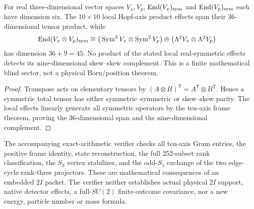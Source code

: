 \documentclass[11pt,a4paper]{article}
\begin{document}
\begin{proposition}
\label{p2f:prop:v318-reciprocal-real-effect-certificate}
For real three-dimensional vector spaces $V_x,V_p$,
$\operatorname{End}(V_x)_{\rm sym}$ and
$\operatorname{End}(V_p)_{\rm sym}$ each have dimension six.
The $10\times10$ local Hopf-axis product effects span their
36-dimensional tensor product, while
\[
 \operatorname{End}(V_x\otimes V_p)_{\rm sym}
 \cong\big(\operatorname{Sym}^2V_x\otimes
           \operatorname{Sym}^2V_p\big)
  \oplus\big(\Lambda^2V_x\otimes\Lambda^2V_p\big)
\]
has dimension $36+9=45$.
No product of the stated local real-symmetric effects detects
its nine-dimensional skew--skew complement.  This is a finite
mathematical blind sector, not a physical Born/position theorem.
\end{proposition}
\begin{proof}
Transpose acts on elementary tensors by
$(A\otimes B)^{\mathsf T}=A^{\mathsf T}\otimes B^{\mathsf T}$.
Hence a symmetric total tensor has either symmetric--symmetric
or skew--skew parity.  The local effects linearly generate all
symmetric operators by the ten-axis frame theorem, proving the
36-dimensional span and the nine-dimensional complement.
\end{proof}

\begin{remark}
\label{p2f:rem:v318-certificate-status}
The accompanying exact-arithmetic verifier checks all ten-axis Gram
entries, the positive frame identity, state reconstruction, the full
252-subset rank classification, the $S_3$ vertex stabilizer, and the
odd-$S_5$ exchange of the two edge-cycle rank-three projectors.
These are mathematical consequences of an embedded $2I$ packet.
The verifier neither establishes actual physical $2I$ support,
native detector effects, a full-$SU(2)$ finite-outcome covariance,
nor a new energy, particle number or mass formula.
\end{remark}
\end{document}
